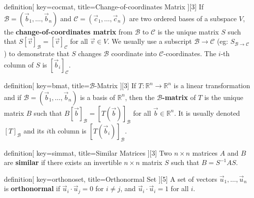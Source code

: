 \begin{SaveConcept}{definition}[
		key=cocmat,
		title={Change-of-coordinates Matrix}
	][3]
        If $\mathcal{B}=(\vec{b}_1,\ldots,\vec{b}_n)$ and $\mathcal{C}=(\vec{c}_1,\ldots,\vec{c}_n)$ are two ordered bases of a subspace $V$, the {\bf change-of-coordinates matrix} from $\mathcal{B}$ to $\mathcal{C}$ is the unique matrix $S$ such that $S[\vec{v}]_{\mathcal{B}}=[\vec{v}]_{\mathcal{C}}$ for all $\vec{v}\in V$. We usually use a subscript $\mathcal{B}\to\mathcal{C}$ (eg: $S_{\mathcal{B}\to\mathcal{C}}$) to demonstrate that $S$ changes $\mathcal B$ coordinate into $\mathcal C$-coordinates. The $i$-th column of $S$ is $[\vec{b}_i]_{\mathcal{C}}$.
\end{SaveConcept}


\begin{SaveConcept}{definition}[
		key=bmat,
		title={$\mathcal{B}$-Matrix}
	][3]
 If $T:\mathbb R^n\to \mathbb R^n$ is a linear transformation and if $\mathcal{B}=(\vec{b}_1,\ldots,\vec{b}_n)$ is a basis of $\mathbb R^n$, then the {\bf $\mathcal{B}$-matrix} of $T$ is the unique matrix $B$ such that $B[\vec{b}]_{\mathcal{B}}=[T(\vec{b})]_{\mathcal{B}}$ for all $\vec{b}\in \mathbb R^n$. It is usually denoted $[T]_{\mathcal{B}}$ and its $i$th column is $[T(\vec{b}_i)]_{\mathcal{B}}$.
\end{SaveConcept}


\begin{SaveConcept}{definition}[
		key=simmat,
		title={Similar Matrices}
	][3]
        Two $n\times n$ matrices $A$ and $B$ are {\bf similar} if there exists an invertible $n\times n$ matrix $S$ such that $B = S^{-1} A S$.
\end{SaveConcept}


\begin{SaveConcept}{definition}[
		key=orthonoset,
		title={Orthonormal Set}
	][5]
        A set of vectors $\vec u_1, \dots, \vec u_n$ is {\bf orthonormal} if $\vec u_i\cdot \vec u_j = 0 $ for  $ i \neq j$, and $\vec u_i\cdot \vec u_i = 1$ for all $i$. 
\end{SaveConcept}

